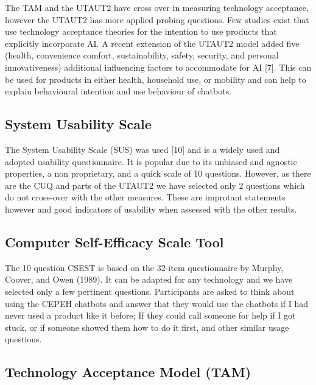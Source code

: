 \documentclass[a4paper, nobind]{templates/ociamthesis}
\begin{document}
The TAM and the UTAUT2 have cross over in measuring technology acceptance, however the UTAUT2 has more applied probing questions.
Few studies exist that use technology acceptance theories for the intention to use products that explicitly incorporate AI.
A recent extension of the UTAUT2 model added five (health, convenience comfort, sustainability, safety, security, and personal innovativeness) additional influencing factors to accommodate for AI {[}7{]}.
This can be used for products in either health, household use, or mobility and can help to explain behavioural intention and use behaviour of chatbots.

\hypertarget{system-usability-scale}{%
\subsection{System Usability Scale}\label{system-usability-scale}}

The System Usability Scale (SUS) was used {[}10{]} and is a widely used and adopted usability questionnaire.
It is popular due to its unbiased and agnostic properties, a non proprietary, and a quick scale of 10 questions. However, as there are the CUQ and parts of the UTAUT2 we have selected only 2 questions which do not cross-over with the other measures. These are improtant statements however and good indicators of usability when assessed with the other results.

\hypertarget{computer-self-efficacy-scale-tool}{%
\subsection{Computer Self-Efficacy Scale Tool}\label{computer-self-efficacy-scale-tool}}

The 10 question CSEST is based on the 32-item questionnaire by Murphy, Coover, and Owen (1989). It can be adapted for any technology and we have selected only a few pertinent questions. Participants are asked to think about using the CEPEH chatbots and answer that they would use the chatbots if I had never used a product like it before; If they could call someone for help if I got stuck, or if someone showed them how to do it first, and other similar usage questions.

\hypertarget{technology-acceptance-model-tam}{%
\subsection{Technology Acceptance Model (TAM)}\label{technology-acceptance-model-tam}}
\end{document}
